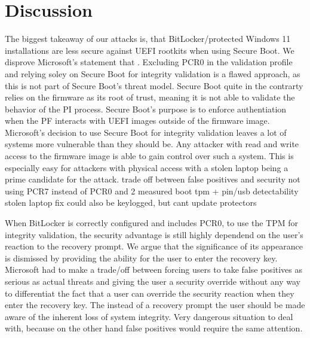 


\chapter{Discussion}


The biggest takeaway of our attacks is, that BitLocker\-/protected Windows 11 installations are less secure against \ac{UEFI} rootkits when using Secure Boot.
We disprove Microsoft's statement that .
Excluding \ac{PCR}0 in the validation profile and relying soley on Secure Boot for integrity validation is a flawed approach, as this is not part of Secure Boot's threat model.
Secure Boot quite in the contrarty relies on the firmware as its root of trust, meaning it is not able to validate the behavior of the \ac{PI} process.
Secure Boot's purpose is to enforce authentiation when the \ac{PF} interacts with \ac{UEFI} images outside of the firmware image.
Microsoft's decision to use Secure Boot for integrity validation leaves a lot of systems more vulnerable than they should be.
Any attacker with read and write access to the firmware image is able to gain control over such a system.
This is especially easy for attackers with physical access with a stolen laptop being a prime candidate for the attack.
trade off between false positives and security
not using \ac{PCR}7 instead of \ac{PCR}0 and 2
measured boot 
tpm + pin/usb detectability stolen laptop fix
could also be keylogged, but cant update protectors






When BitLocker is correctly configured and includes \ac{PCR}0, to use the \ac{TPM} for integrity validation, the security advantage is still highly dependend on the user's reaction to the recovery prompt.
We argue that the significance of its appearance is dismissed by providing the ability for the user to enter the recovery key.
Microsoft had to make a trade\-/off between forcing users to take false positives as serious as actual threats and giving the user a security override without any way to differentiat
the fact that a user can override the security reaction when they enter the recovery key.
The instead of a recovery prompt the user should be made aware of the inherent loss of system integrity.
Very dangerous situation to deal with, because on the other hand false positives would require the same attention.




